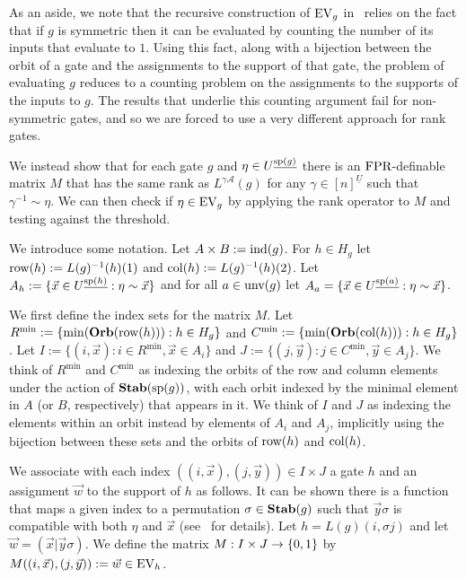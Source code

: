 \documentclass[a4paper,UKenglish]{lipics-v2018}
\begin{document}
As an aside, we note that the recursive construction of $\text{EV}_g$
in~\cite{AndersonD17} relies on the fact that if $g$ is symmetric then it can be
evaluated by counting the number of its inputs that evaluate to $1$. Using this
fact, along with a bijection between the orbit of a gate and the assignments to
the support of that gate, the problem of evaluating $g$ reduces to a counting
problem on the assignments to the supports of the inputs to $g$. The results
that underlie this counting argument fail for non-symmetric gates, and so we are
forced to use a very different approach for rank gates.

We instead show that for each gate $g$ and $\eta \in U^{\underline{\text{sp}(g)}}$
there is an $\text{\upshape FPR}$-definable matrix $M$ that has the same rank as $L^{\gamma
  \mathcal{A}}(g)$ for any $\gamma \in [n]^{\underline{U}}$ such that
$\gamma^{-1} \sim \eta$. We can then check if $\eta \in \text{EV}_g$ by applying the
rank operator to $M$ and testing against the threshold.

We introduce some notation. Let $A \times B := \text{\upshape ind}(g)$. For $h \in H_g$ let
$\text{row}(h) := L(g)^{-1}(h)(1)$ and $\text{col}(h) := L(g)^{-1}(h)(2)$. Let $A_h := \{
\vec{x} \in U^{\underline{\text{sp}(h)}} : \eta \sim \vec{x} \}$ and for all $a \in
\text{unv}(g)$ let $A_a = \{\vec{x} \in U^{\underline{\text{sp}(a)}} : \eta \sim
\vec{x}\}$.

We first define the index sets for the matrix $M$. Let $R^{\min} := \{\min
(\text{\textbf{Orb}}(\text{row}(h))) : h \in H_g\}$ and $C^{\min} := \{ \min (\text{\textbf{Orb}} (\text{col}(h))) : h
\in H_g\}$. Let $I := \{(i, \vec{x}): i \in R^{\min}, \vec{x} \in A_i\}$ and $J
:= \{(j, \vec{y}): j \in C^{\min}, \vec{y} \in A_j\}$. We think of $R^{\min}$
and $C^{\min}$ as indexing the orbits of the row and column elements under the
action of $\text{\textbf{Stab}}(\text{sp}(g))$, with each orbit indexed by the minimal element in
$A$ (or $B$, respectively) that appears in it. We think of $I$ and $J$ as
indexing the elements within an orbit instead by elements of $A_i$ and $A_j$,
implicitly using the bijection between these sets and the orbits of $\text{row}(h)$
and $\text{col}(h)$.

We associate with each index $((i, \vec{x}), (j, \vec{y})) \in I \times J$ a
gate $h$ and an assignment $\vec{w}$ to the support of $h$ as follows. It can be
shown there is a function that maps a given index to a permutation $\sigma \in
\text{\textbf{Stab}}(g)$ such that $\vec{y} \sigma$ is compatible with both $\eta$ and
$\vec{x}$ (see~\cite{DW-arxiv} for details). Let $h = L(g)(i, \sigma j)$ and let $\vec{w} =
(\vec{x} \vert \vec{y} \sigma)$. We define the matrix $M : I \times J \rightarrow
\{0,1\}$ by $M((i , \vec{x}), (j, \vec{y})) := \vec{w} \in \text{EV}_h$.
\end{document}
